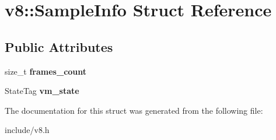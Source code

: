\hypertarget{structv8_1_1_sample_info}{}\section{v8\+:\+:Sample\+Info Struct Reference}
\label{structv8_1_1_sample_info}
\subsection*{Public Attributes}
\begin{DoxyCompactItemize}
\item 
size\+\_\+t {\bfseries frames\+\_\+count}\hypertarget{structv8_1_1_sample_info_a5f1e51bc358605e0c1d38fb2f3d344cd}{}\label{structv8_1_1_sample_info_a5f1e51bc358605e0c1d38fb2f3d344cd}

\item 
State\+Tag {\bfseries vm\+\_\+state}\hypertarget{structv8_1_1_sample_info_afd6198c9feb44a8df79576cf427b9a91}{}\label{structv8_1_1_sample_info_afd6198c9feb44a8df79576cf427b9a91}

\end{DoxyCompactItemize}


The documentation for this struct was generated from the following file\+:\begin{DoxyCompactItemize}
\item 
include/v8.\+h\end{DoxyCompactItemize}
